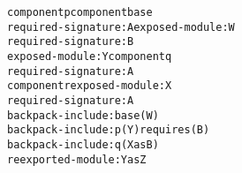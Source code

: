 
\newsavebox{\runningexample}
\begin{lrbox}{\runningexample}
\begin{minipage}{\linewidth}
\begin{alltt}

component p             component base
 required-signature: A   exposed-module: W
 required-signature: B
 exposed-module: Y      component q
                         required-signature: A
component r              exposed-module: X
 required-signature: A
 backpack-include: base (W)
 backpack-include: p (Y) requires (B)
 backpack-include: q (X as B)
 reexported-module: Y as Z
\end{alltt}
\end{minipage}
\end{lrbox}


\newcommand{\figsep}{\vspace*{.2cm}\textcolor{gray}{\rule{\linewidth}{.25pt}}}
\newcommand{\capsep}{\vspace*{.2cm}}%

